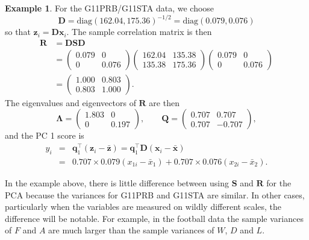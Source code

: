 \documentclass[]{book}
\theoremstyle{definition}
\theoremstyle{definition}
\newtheorem{example}{Example}[chapter]
\theoremstyle{definition}
\theoremstyle{remark}
\begin{document}
\begin{example}
\protect\hypertarget{exm:unnamed-chunk-13}{}{\label{exm:unnamed-chunk-13} }For the G11PRB/G11STA data, we choose
\[
\boldsymbol D= \text{diag}(162.04,175.36)^{-1/2} = \text{diag}(0.079,0.076)
\]
so that \(\boldsymbol z_i = \boldsymbol D\boldsymbol x_i\).
The sample correlation matrix is then
\begin{align*}
\boldsymbol R&= \boldsymbol D\boldsymbol S\boldsymbol D\\
 &= \begin{pmatrix} 0.079 & 0 \\ 0 & 0.076 \end{pmatrix}
\begin{pmatrix} 162.04 & 135.38 \\ 135.38 & 175.36 \end{pmatrix}
\begin{pmatrix} 0.079 & 0 \\ 0 & 0.076 \end{pmatrix} \\
&= \begin{pmatrix} 1.000 & 0.803 \\ 0.803 & 1.000 \end{pmatrix}.
\end{align*}
The eigenvalues and eigenvectors of \(\boldsymbol R\) are then
\[\boldsymbol \Lambda= \begin{pmatrix} 1.803 & 0 \\ 0 & 0.197 \end{pmatrix}, \qquad
\boldsymbol Q= \begin{pmatrix} 0.707 & 0.707 \\ 0.707 & -0.707 \end{pmatrix},\]
and the PC 1 score is
\begin{eqnarray*}
y_i &=& \boldsymbol q_1^\top (\boldsymbol z_i - \bar{\boldsymbol z}) = \boldsymbol q_1^\top \boldsymbol D(\boldsymbol x_i - \bar{\boldsymbol x}) \\
&=& 0.707 \times 0.079 (x_{1i} - \bar{x}_1) + 0.707 \times 0.076 (x_{2i} - \bar{x}_2).
\end{eqnarray*}

In the example above, there is little difference between using \(\boldsymbol S\) and \(\boldsymbol R\) for the PCA because the variances for G11PRB and G11STA are similar. In other cases, particularly when the variables are measured on wildly different scales, the difference will be notable. For example, in the football data the sample variances of \(F\) and \(A\) are much larger than the sample variances of \(W\), \(D\) and \(L\).
\end{example}
\end{document}
